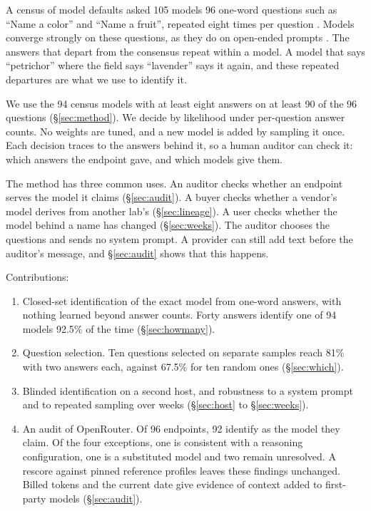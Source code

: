 \documentclass[11pt]{article}
\begin{document}
A census of model defaults asked 105 models 96 one-word questions such as ``Name a color'' and
``Name a fruit'', repeated eight times per question \citep{parikh2026census}. Models converge
strongly on these questions, as they do on open-ended prompts \citep{jiang2025hivemind}. The
answers that depart from the consensus repeat within a model. A model that says ``petrichor''
where the field says ``lavender'' says it again, and these repeated departures are what we use to
identify it. 

We use the 94 census models with at least eight answers on at least 90 of the 96
questions (\S\ref{sec:method}). We decide by likelihood
under per-question answer counts. No weights are tuned, and a new model is added by sampling it
once. Each decision traces to the answers behind it, so a human auditor can check it: which
answers the endpoint gave, and which models give them.

The method has
three common uses. An auditor checks whether an endpoint serves the model it claims
(\S\ref{sec:audit}). A buyer checks whether a vendor's model derives from another lab's
(\S\ref{sec:lineage}). A user checks whether the model behind a name has changed
(\S\ref{sec:weeks}). The auditor chooses the questions and sends no system prompt. A provider can still add text before
the auditor's message, and \S\ref{sec:audit} shows that this happens.

Contributions:
\begin{enumerate}\setlength{\itemsep}{0pt}
\item Closed-set identification of the exact model from one-word answers, with nothing learned
beyond answer counts. Forty answers identify one of 94 models 92.5\% of the time
(\S\ref{sec:howmany}).
\item Question selection. Ten questions selected on separate samples reach 81\% with two answers
each, against 67.5\% for ten random ones (\S\ref{sec:which}).
\item Blinded identification on a second host, and robustness to a system prompt and to repeated
sampling over weeks (\S\ref{sec:host} to \S\ref{sec:weeks}).
\item An audit of OpenRouter. Of 96 endpoints, 92 identify as the model they claim. Of the four
exceptions, one is consistent with a reasoning configuration, one is a substituted model and two remain
unresolved. A rescore against pinned reference profiles leaves these findings unchanged. Billed
tokens and the current date give evidence of context added to first-party models
(\S\ref{sec:audit}).
\end{enumerate}
\end{document}
